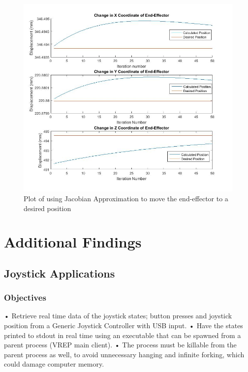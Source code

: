 \documentclass[12pt,openany,a4paper]{book}
\begin{document}
\begin{center}
\begin{figure}[htb]
  \includegraphics[width=1\linewidth]{jacobian_plot.jpg}
\caption{Plot of using Jacobian Approximation to move the end-effector to a desired position }
\end{figure}
\end{center}


\chapter{Additional Findings}

\section{Joystick Applications}
\subsection{Objectives}
•	Retrieve real time data of the joystick states; button presses and joystick position from a Generic Joystick Controller with USB input.
•	Have the states printed to stdout in real time using an executable that can be spawned from a parent process (VREP main client).
•	The process must be killable from the parent process as well, to avoid unnecessary hanging and infinite forking, which could damage computer memory.
\end{document}
